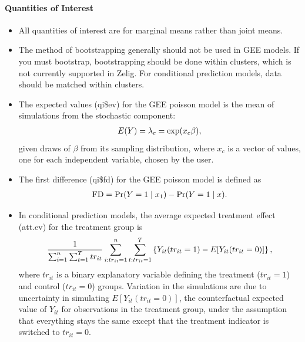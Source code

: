 \documentclass[letterpaper,10pt,english]{sphinxmanual}
\begin{document}
\paragraph{Quantities of Interest}
\label{zelig-poissongee:quantities-of-interest}\begin{itemize}
\item {} 
All quantities of interest are for marginal means rather than joint
means.

\item {} 
The method of bootstrapping generally should not be used in GEE
models. If you must bootstrap, bootstrapping should be done within
clusters, which is not currently supported in Zelig. For conditional
prediction models, data should be matched within clusters.

\item {} 
The expected values (qi\$ev) for the GEE poisson model is the mean of
simulations from the stochastic component:
\begin{gather}
\begin{split}E(Y) =
  \lambda_{c} = \mathrm{exp}(x_{c} \beta),\end{split}\notag
\end{gather}
given draws of \(\beta\) from its sampling distribution, where
\(x_{c}\) is a vector of values, one for each independent
variable, chosen by the user.

\item {} 
The first difference (qi\$fd) for the GEE poisson model is defined as
\begin{gather}
\begin{split}\textrm{FD} = \Pr(Y = 1 \mid x_1) - \Pr(Y = 1 \mid x).\end{split}\notag
\end{gather}
\item {} 
In conditional prediction models, the average expected treatment
effect (att.ev) for the treatment group is
\begin{gather}
\begin{split}\frac{1}{\sum_{i=1}^n \sum_{t=1}^T tr_{it}}\sum_{i:tr_{it}=1}^n \sum_{t:tr_{it}=1}^T \left\{ Y_{it}(tr_{it}=1) -
      E[Y_{it}(tr_{it}=0)] \right\},\end{split}\notag
\end{gather}
where \(tr_{it}\) is a binary explanatory variable defining the
treatment (\(tr_{it}=1\)) and control (\(tr_{it}=0\)) groups.
Variation in the simulations are due to uncertainty in simulating
\(E[Y_{it}(tr_{it}=0)]\), the counterfactual expected value of
\(Y_{it}\) for observations in the treatment group, under the
assumption that everything stays the same except that the treatment
indicator is switched to \(tr_{it}=0\).

\end{itemize}
\end{document}
